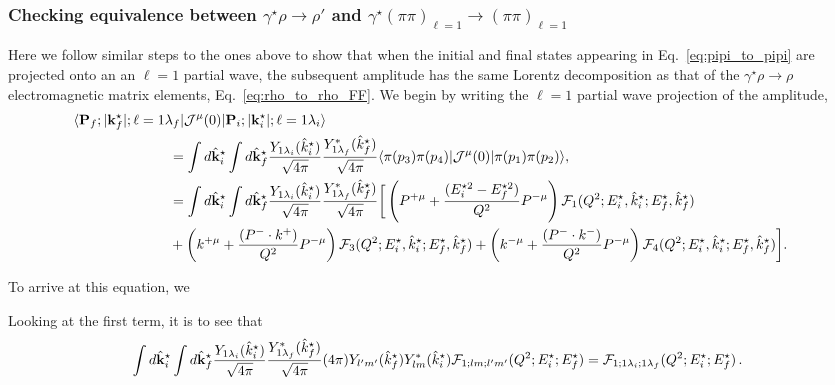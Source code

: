 \subsubsection{Checking equivalence between $\gamma^\star\rho\to\rho'$ and $\gamma^\star(\pi\pi)_{\ell=1}\to(\pi\pi)_{\ell=1}$}

Here we follow similar steps to the ones above to show that when the initial and final states appearing in Eq.~\ref{eq:pipi_to_pipi}  are projected onto an an $\ell=1$ partial wave, the subsequent amplitude has the same Lorentz decomposition as that of the $\gamma^\star\rho\to\rho$ electromagnetic matrix elements, Eq.~\ref{eq:rho_to_rho_FF}. We begin by writing the $\ell=1$ partial wave projection of the amplitude, 
\begin{align}
\langle{\bf P}_f;|{\bf k}^\star_f|;\ell=1\lambda_f|{\cal J}^\mu(0)|{\bf P}_i;|{\bf k}^\star_i|;\ell=1\lambda_i\rangle\, \nn\\
&\hspace{-4cm}
=
\int d\hat{\bf k}^\star_i\int d\hat{\bf k}^\star_f
\frac{Y_{1\lambda_i}(\hat{k}_i^\star)}{\sqrt{4\pi}}
\frac{Y^*_{1\lambda_f}(\hat{k}_f^\star)}{\sqrt{4\pi}}
\langle \pi(p_3)\pi(p_4)|{\cal J}^\mu(0)|\pi(p_1)\pi(p_2)\rangle,\nn\\
&\hspace{-4cm}=
\int d\hat{\bf k}^\star_i\int d\hat{\bf k}^\star_f
\frac{Y_{1\lambda_i}(\hat{k}_i^\star)}{\sqrt{4\pi}}
\frac{Y^*_{1\lambda_f}(\hat{k}_f^\star)}{\sqrt{4\pi}}
\bigg[ \left(P^{+\mu}+\frac{(E_i^{\star 2}-E_f^{\star 2})}{Q^2} P^{-\mu}\right)\mathcal{F}_{1}(Q^2;E_i^\star,\hat{k}^\star_i;E_f^\star,\hat{k}^\star_f)
\nn\\
&\hspace{-4cm}
+
\left(k^{+\mu}+\frac{(P^-\cdot k^{+})}{Q^2} P^{-\mu}\right)
\mathcal{F}_{3}(Q^2;E_i^\star,\hat{k}^\star_i;E_f^\star,\hat{k}^\star_f)
+
\left(k^{-\mu}+\frac{(P^-\cdot k^{-})}{Q^2} P^{-\mu}\right)
\mathcal{F}_{4}(Q^2;E_i^\star,\hat{k}^\star_i;E_f^\star,\hat{k}^\star_f)\bigg].
\label{eq:pipi_to_pipi_Pwave}
\end{align}

{}

To arrive at this equation, we 

Looking at the first term, it is to see that
\begin{align}
\int d\hat{\bf k}^\star_i\int d\hat{\bf k}^\star_f
\frac{Y_{1\lambda_i}(\hat{k}_i^\star)}{\sqrt{4\pi}}
\frac{Y^*_{1\lambda_f}(\hat{k}_f^\star)}{\sqrt{4\pi}}
(4\pi)Y_{l^\prime m^\prime}(\hat{k}_f^\star)  
Y^*_{lm}(\hat{k}_i^\star)
 \mathcal{F}_{1;l m;l^\prime m^\prime}(Q^2;E_i^\star;E_f^\star)=\mathcal{F}_{1;1 \lambda_i;1 \lambda_f}(Q^2;E_i^\star;E_f^\star)\, .\label{eq:pw_dec_1st}
\end{align}

